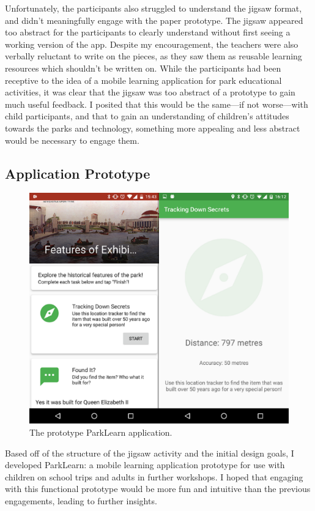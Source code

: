 Unfortunately, the participants also struggled to understand the jigsaw format, and didn't meaningfully engage with the paper prototype. The jigsaw appeared too abstract for the participants to clearly understand without first seeing a working version of the app. Despite my encouragement, the teachers were also verbally reluctant to write on the pieces, as they saw them as reusable learning resources which shouldn't be written on. While the participants had been receptive to the idea of a mobile learning application for park educational activities, it was clear that the jigsaw was too abstract of a prototype to gain much useful feedback. I posited that this would be the same---if not worse---with child participants, and that to gain an understanding of children’s attitudes towards the parks and technology, something more appealing and less abstract would be necessary to engage them. 

\subsection{Application Prototype}

\begin{figure}
  \centering
  \includegraphics[width=0.8\columnwidth]{images/chapter04/parklearnprototype.png}
  \caption{The prototype ParkLearn application.}
  \label{fig:parklearnPrototype}
\end{figure}

Based off of the structure of the jigsaw activity and the initial design goals, I developed ParkLearn: a mobile learning application prototype for use with children on school trips and adults in further workshops. I hoped that engaging with this functional prototype would be more fun and intuitive than the previous engagements, leading to further insights.


